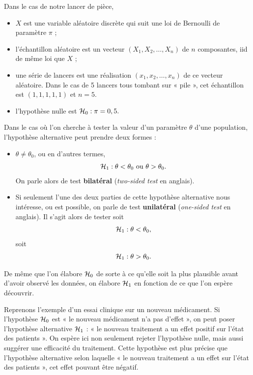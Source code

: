 \begin{exemple}
  Dans le cas de notre lancer de pièce,
  \begin{itemize}
  \item $X$ est une variable aléatoire discrète qui suit une loi de Bernoulli
    de paramètre $\pi$ ;
  \item l'échantillon aléatoire est un vecteur $(X_1, X_2, \dots, X_n)$ de $n$
    composantes, iid de même loi que $X$ ;
  \item une série de lancers est une réalisation $(x_1, x_2, \dots, x_n)$ de ce
    vecteur aléatoire. Dans le cas de 5 lancers tous tombant sur « pile »,
    cet échantillon est $(1, 1, 1, 1, 1)$ et $n=5.$
  \item l'hypothèse nulle est $\mathcal{H}_0: \pi = 0,5.$
  \end{itemize}
\end{exemple}

Dans le cas où l'on cherche à tester la valeur d'un paramètre $\theta$ d'une
population, l'hypothèse alternative peut prendre deux formes :
\begin{itemize}
\item $\theta \neq \theta_0$, ou en d'autres termes, 
  \begin{equation}
    \label{eq:h1_bilateral}
    \mathcal{H}_1: \theta < \theta_0 \text{ ou } \theta > \theta_0.
  \end{equation}
  On parle alors de test \textbf{bilatéral} (\textit{two-sided test} en
  anglais).
\item Si seulement l'une des deux parties de cette hypothèse alternative nous
  intéresse, ou est possible, on parle de test \textbf{unilatéral}
  (\textit{one-sided test} en anglais). Il s'agit alors de tester soit
  \begin{equation}
    \label{eq:h1_unilateral_gauche}
    \mathcal{H}_1: \theta < \theta_0,
  \end{equation}
  soit
  \begin{equation}
    \label{eq:h1_unilateral_droite}
    \mathcal{H}_1:  \theta > \theta_0.
  \end{equation}
\end{itemize}

De même que l'on élabore $\mathcal{H}_0$ de sorte à ce qu'elle soit la plus plausible
avant d'avoir observé les données, on élabore $\mathcal{H}_1$ en fonction de ce que
l'on espère découvrir. 

Reprenons l'exemple d'un essai clinique sur un nouveau médicament. Si
l'hypothèse $\mathcal{H}_0$ est « le nouveau médicament n'a pas d'effet », on peut
poser l'hypothèse alternative $\mathcal{H}_1$ : « le nouveau traitement a un effet
positif sur l'état des patients ». On espère ici non seulement rejeter
l'hypothèse nulle, mais aussi suggérer une efficacité du traitement. Cette
hypothèse est plus précise que l'hypothèse alternative selon laquelle « le
nouveau traitement a un effet sur l'état des patients », cet effet pouvant être
négatif.

